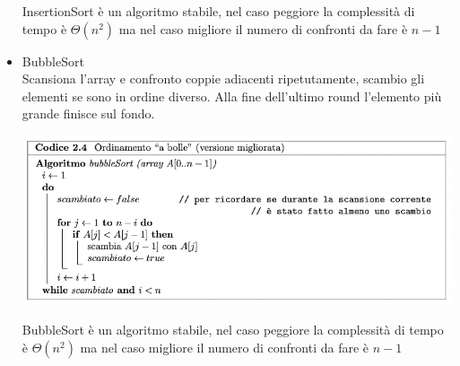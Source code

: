 \documentclass[11pt, oneside]{article}   	%
\begin{document}
\begin{itemize}
\begin{center}
\end{center}
InsertionSort è un algoritmo stabile, nel caso peggiore la complessità di tempo è $\Theta(n^2)$ ma nel caso migliore il numero di confronti da fare è $n-1$
\item BubbleSort\\
Scansiona l'array e confronto coppie adiacenti ripetutamente, scambio gli elementi se sono in ordine diverso. Alla fine dell'ultimo round l'elemento più grande finisce sul fondo.
\begin{center}
\includegraphics[scale=0.8]{bubsort}
\end{center}
BubbleSort è un algoritmo stabile, nel caso peggiore la complessità di tempo è $\Theta(n^2)$ ma nel caso migliore il numero di confronti da fare è $n-1$
\end{itemize}
\end{document}
